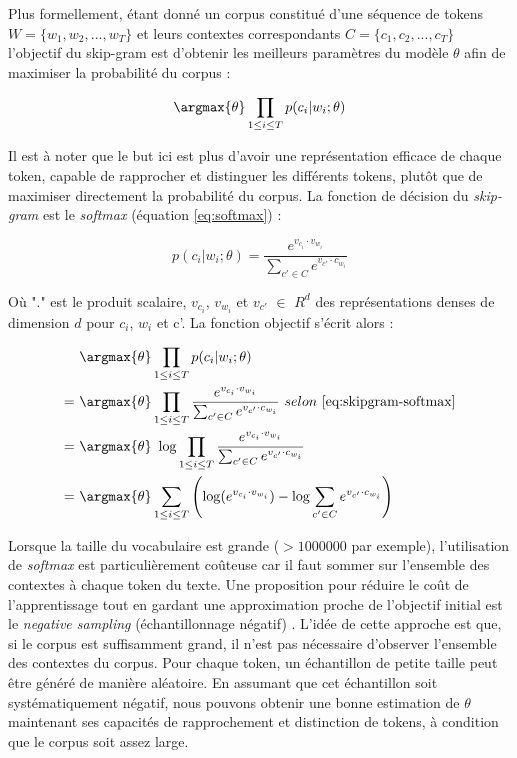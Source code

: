 \documentclass[12pt,a4paper,times,twoside,openright]{report}
\begin{document}
Plus formellement, étant donné un corpus constitué d'une séquence de tokens $W = \{w_{1}, w_{2}, ..., w_{T}\}$ et leurs contextes correspondants $C = \{c_{1}, c_{2}, ..., c_{T}\}$ l'objectif du skip-gram est d'obtenir les meilleurs paramètres du modèle $\theta$ afin de maximiser la probabilité du corpus :

\begin{equation}\label{eq:skipgram}
\argmax{\theta} \prod_{1 \leq i \leq T} p(c_{i}|w_{i};\theta)
\end{equation}

Il est à noter que le but ici est plus d'avoir une représentation efficace de chaque token, capable de rapprocher et distinguer les différents tokens, plutôt que de maximiser directement la probabilité du corpus. La fonction de décision du \textit{skip-gram} est le \textit{softmax} (équation \ref{eq:softmax}) :

\begin{equation}\label{eq:skipgram-softmax}
p(c_{i}|w_{i};\theta) = \frac{e^{v_{c_{i}} \cdot v_{w_{i}}}}{\sum_{c' \in C} e^{v_{c'} \cdot c_{w_{i}}}}
\end{equation}

Où "." est le produit scalaire, $v_{c_{i}}$, $v_{w_{i}}$ et $v_{c'}$ $\in$ $R^{d}$ des représentations denses de dimension $d$ pour $c_{i}$, $w_{i}$ et c'. La fonction objectif s'écrit alors :

\begin{equation}\label{eq:skipgram-objective}
\begin{aligned}
  &\ \argmax{\theta} \prod_{1 \leq i \leq T} p(c_{i}|w_{i};\theta) \\
= &\ \argmax{\theta} \prod_{1 \leq i \leq T} \frac{e^{v_{c_{i}} \cdot v_{w_{i}}}}{\sum_{c' \in C} e^{v_{c'} \cdot c_{w_{i}}}}\ selon\ \ref{eq:skipgram-softmax}\\
= &\ \argmax{\theta}\ \log \prod_{1 \leq i \leq T} \frac{e^{v_{c_{i}} \cdot v_{w_{i}}}}{\sum_{c' \in C} e^{v_{c'} \cdot c_{w_{i}}}} \\
= &\ \argmax{\theta} \sum_{1 \leq i \leq T} \left( \log(e^{v_{c_{i}} \cdot v_{w_{i}}}) - \log \sum_{c' \in C} e^{v_{c'} \cdot c_{w_{i}}} \right) \\
\end{aligned}
\end{equation}

Lorsque la taille du vocabulaire est grande ($>1000000$ par exemple), l'utilisation de \textit{softmax} est particulièrement coûteuse car il faut sommer sur l'ensemble des contextes à chaque token du texte. Une proposition pour réduire le coût de l'apprentissage tout en gardant une approximation proche de l'objectif initial est le \textit{negative sampling} (échantillonnage négatif) \citep{mikolov2013distributed}. L'idée de cette approche est que, si le corpus est suffisamment grand, il n'est pas nécessaire d'observer l'ensemble des contextes du corpus. Pour chaque token, un échantillon de petite taille peut être généré de manière aléatoire. En assumant que cet échantillon soit systématiquement négatif, nous pouvons obtenir une bonne estimation de $\theta$ maintenant ses capacités de rapprochement et distinction de tokens, à condition que le corpus soit assez large.
\end{document}
